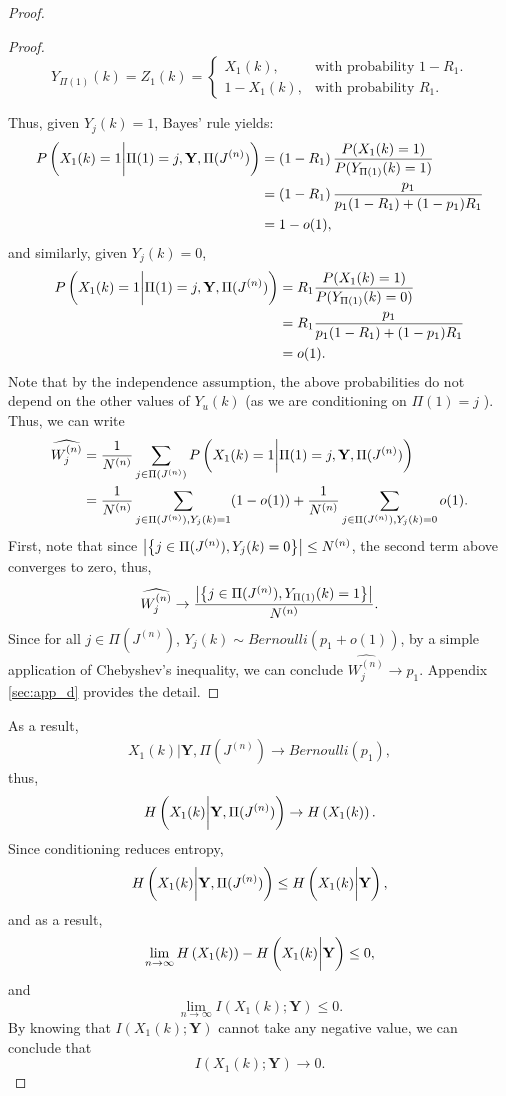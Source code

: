\begin{proof}
\begin{proof}
\[
Y_{\Pi(1)}(k)={Z}_{1}(k)=\begin{cases}
{X}_{1}(k), & \textrm{with probability } 1-R_1.\\
1-{X}_{1}(k), & \textrm{with probability } R_1.
\end{cases}
\]

Thus, given $Y_{j}(k)=1$, Bayes' rule yields:
\begin{align*}
 P\left(X_1(k)=1 \bigg{|} \Pi(1)=j, \textbf{Y}, \Pi (J^{(n)})\right)&= \left(1- R_1 \right) \frac{P(X_1(k)=1)}{P(Y_{\Pi(1)}(k)=1)}\\
 &=\left(1-R_1 \right) \frac{p_1}{p_1 (1- R_1)+(1-p_1)R_1}\\
 &=1-o(1),
\end{align*}
and similarly, given $Y_{j}(k)=0$,
\begin{align*}
P\left(X_1(k)=1 \bigg{|} \Pi(1)=j, \textbf{Y}, \Pi (J^{(n)})\right)&= R_1 \frac{P(X_1(k)=1)}{P(Y_{\Pi(1)}(k)=0)}\\
&=R_1 \frac{p_1}{p_1 (1- R_1)+(1-p_1)R_1}\\
&=o(1).
\end{align*}
Note that by the independence assumption, the above probabilities do not depend on the other values of $Y_{u}(k)$ (as we are conditioning on $\Pi(1)=j$ ).
Thus, we can write
\begin{align}
	\no \widehat{W_j^{(n)}} &= \frac{1}{N^{(n)}} \sum_{j \in \Pi(J^{(n)})} P\left(X_1(k)=1 \bigg{|} \Pi(1)=j, \textbf{Y}, \Pi (J^{(n)})\right)\\
\no &=\frac{1}{N^{(n)}} \sum_{j \in \Pi(J^{(n)}), Y_{j}(k)=1}  (1-o(1)) + \frac{1}{N^{(n)}} \sum_{j \in \Pi(J^{(n)}), Y_{j}(k)=0}  o(1).
\end{align}
First, note that since $\abs*{\left\{j \in \Pi(J^{(n)}), Y_{j}(k)=0\right\}} \leq N^{(n)}$, the second term above converges to zero, thus,
\begin{align}
	\no \widehat{W_j^{(n)}}  \rightarrow \frac{\abs*{\left\{ j \in \Pi(J^{(n)}), Y_{\Pi(1)}(k)=1\right\} }}{N^{(n)}}.
\end{align}
Since for all $j \in \Pi(J^{(n)})$, $ Y_{j}(k)  \sim Bernoulli \left(p_1+o(1)\right)$, by a simple application of Chebyshev's inequality, we can conclude $\widehat{W_j^{(n)}}\rightarrow p_1$. Appendix \ref{sec:app_d} provides the detail.
\end{proof}	

As a result,
\begin{align*}
X_1(k) {|} \textbf{Y}, \Pi (J^{(n)})\rightarrow \textit{Bernoulli} (p_1),
\end{align*}
thus,
\[H\left(X_1(k) \bigg{|} \textbf{Y}, \Pi (J^{(n)})\right)\rightarrow H\left(X_1(k)\right).\]
Since conditioning reduces entropy,
\[H\left(X_1(k) \bigg{|} \textbf{Y}, \Pi (J^{(n)})\right)\leq H\left(X_1(k) \bigg{|} \textbf{Y}\right),\]
and as a result,
\[\lim_{n \rightarrow \infty}   H\left(X_1(k)\right)-H\left(X_1(k) \bigg{|} \textbf{Y}\right) \leq 0,\]
and 
\[\lim_{n \rightarrow \infty}   I\left(X_1(k);\textbf{Y}\right)\leq 0.\]
By knowing that $I\left(X_1(k);\textbf{Y}\right)$ cannot take any negative value, we can conclude that
\[I\left(X_1(k);\textbf{Y}\right)\rightarrow 0.\]
\end{proof}

